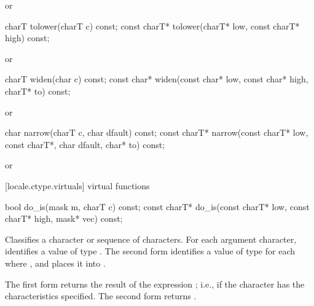 \begin{itemdescr}
\pnum
\returns
{}
or
\end{itemdescr}

%
%
\begin{itemdecl}
charT        tolower(charT c) const;
const charT* tolower(charT* low, const charT* high) const;
\end{itemdecl}

\begin{itemdescr}
\pnum
\returns
{}
or
\end{itemdescr}

%
%
\begin{itemdecl}
charT       widen(char c) const;
const char* widen(const char* low, const char* high, charT* to) const;
\end{itemdecl}

\begin{itemdescr}
\pnum
\returns
{}
or
\end{itemdescr}

%
%
\begin{itemdecl}
char         narrow(charT c, char dfault) const;
const charT* narrow(const charT* low, const charT*, char dfault,
                    char* to) const;
\end{itemdecl}

\begin{itemdescr}
\pnum
\returns
{}
or
\end{itemdescr}

[locale.ctype.virtuals]{ virtual functions}

%
%
\begin{itemdecl}
bool         do_is(mask m, charT c) const;
const charT* do_is(const charT* low, const charT* high,
                   mask* vec) const;
\end{itemdecl}

\begin{itemdescr}
\pnum
\effects
Classifies a character or sequence of characters.
For each argument character, identifies a value
of type
.
The second form identifies a value  of type
for each
where
,
and places it into
.

\pnum
\returns
The first form returns the result of the expression
;
i.e.,
if the character has the characteristics specified.
The second form returns .
\end{itemdescr}

